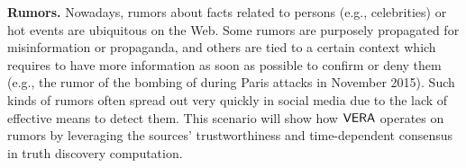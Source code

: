 \textbf{Rumors.} Nowadays, rumors about facts related to persons (e.g., celebrities) or hot events are ubiquitous on the Web.
Some rumors are purposely propagated for misinformation or propaganda,  and others are tied to a certain context which requires to have more information as soon as possible to confirm or deny them (e.g., the rumor of the bombing of  during Paris attacks in November 2015). Such kinds of rumors often spread out very quickly in  social media due to the lack of effective means to detect them. This scenario will show how $\mathsf{VERA}$ operates on rumors  by leveraging the sources' trustworthiness and time-dependent consensus in truth discovery computation.

